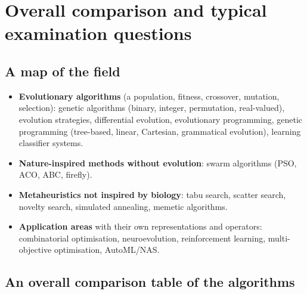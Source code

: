 \documentclass[11pt,a4paper]{article}
\theoremstyle{definition}
\begin{document}
\section*{Overall comparison and typical examination questions}
\label{sec:zaver}
\subsection*{A map of the field}

\begin{itemize}
\item \textbf{Evolutionary algorithms} (a population, fitness, crossover,
  mutation, selection): genetic algorithms (binary, integer, permutation,
  real-valued), evolution strategies, differential evolution, evolutionary
  programming, genetic programming (tree-based, linear, Cartesian, grammatical
  evolution), learning classifier systems.
\item \textbf{Nature-inspired methods without evolution}: swarm algorithms
  (PSO, ACO, ABC, firefly).
\item \textbf{Metaheuristics not inspired by biology}: tabu search,
  scatter search, novelty search, simulated annealing, memetic algorithms.
\item \textbf{Application areas} with their own representations and operators:
  combinatorial optimisation, neuroevolution, reinforcement learning,
  multi-objective optimisation, AutoML/NAS.
\end{itemize}

\subsection*{An overall comparison table of the algorithms}
\end{document}
